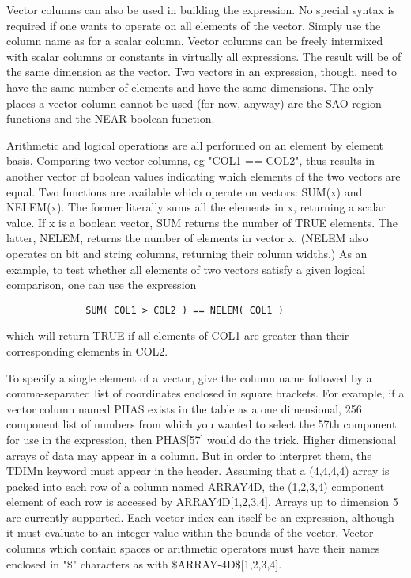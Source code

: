 \documentclass[11pt]{book}
\begin{document}
    Vector columns can also be used  in  building  the  expression.   No
    special  syntax  is required if one wants to operate on all elements
    of the vector.  Simply use the column name as for a  scalar  column.
    Vector  columns  can  be  freely  intermixed  with scalar columns or
    constants in virtually all expressions.  The result will be  of  the
    same dimension as the vector.  Two vectors in an expression, though,
    need to  have  the  same  number  of  elements  and  have  the  same
    dimensions.   The  only  places  a vector column cannot be used (for
    now, anyway) are the SAO  region  functions  and  the  NEAR  boolean
    function.

    Arithmetic and logical operations are all performed on an element by
    element basis.  Comparing two vector columns,  eg  "COL1  ==  COL2",
    thus  results  in  another vector of boolean values indicating which
    elements of the two vectors are equal.  Two functions are  available
    which   operate   on  vectors:  SUM(x)  and  NELEM(x).   The  former
    literally sums all the elements in x, returning a scalar value.   If
    x  is  a  boolean  vector,  SUM returns the number of TRUE elements.
    The latter, NELEM, returns the  number  of  elements  in  vector  x.
    (NELEM  also  operates  on  bit  and string columns, returning their
    column widths.)  As an example, to test whether all elements of  two
    vectors  satisfy  a  given  logical  comparison,  one  can  use  the
    expression


\begin{verbatim}
              SUM( COL1 > COL2 ) == NELEM( COL1 )
\end{verbatim}

    which will return TRUE if all elements  of  COL1  are  greater  than
    their corresponding elements in COL2.

    To  specify  a  single  element  of  a  vector, give the column name
    followed by  a  comma-separated  list  of  coordinates  enclosed  in
    square  brackets.  For example, if a vector column named PHAS exists
    in the table as a one dimensional, 256  component  list  of  numbers
    from  which  you  wanted to select the 57th component for use in the
    expression, then PHAS[57] would do the  trick.   Higher  dimensional
    arrays  of  data  may appear in a column.  But in order to interpret
    them, the TDIMn keyword must appear in the header.  Assuming that  a
    (4,4,4,4)  array  is packed into each row of a column named ARRAY4D,
    the  (1,2,3,4)  component  element  of  each  row  is  accessed   by
    ARRAY4D[1,2,3,4].    Arrays   up   to   dimension  5  are  currently
    supported.  Each vector index can itself be an expression,  although
    it  must  evaluate  to  an  integer  value  within the bounds of the
    vector.  Vector columns which contain spaces or arithmetic operators
    must   have   their   names  enclosed  in  "\$"  characters  as  with
    \$ARRAY-4D\$[1,2,3,4].
\end{document}
